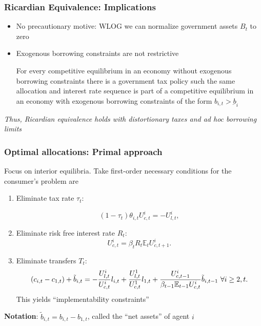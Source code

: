 \documentclass{beamer}
\begin{document}
\begin{frame}
 \frametitle{Ricardian Equivalence: Implications}
 \begin{itemize}
 \item No precautionary motive: WLOG  we can normalize government assets $B_t$ to zero
  \item Exogenous borrowing constraints are not restrictive
\begin{theorem}
 For every  competitive
equilibrium   in an economy without
exogenous borrowing constraints there is a government tax policy such the same allocation and interest rate sequence is  part of a competitive equilibrium
in an economy with exogenous borrowing constraints of the form $b_{i,t}>\underbar{b}_i$
\end{theorem}
  \end{itemize}

  \color{red}\emph{Thus, Ricardian equivalence holds with distortionary taxes and ad hoc borrowing limits}

\end{frame}


\begin{frame}
 \frametitle{Optimal allocations: Primal approach}
Focus on  interior equilibria. Take first-order necessary conditions for the  consumer's problem
 are%

 \begin{enumerate}
  \item Eliminate tax rate $\tau_t$:

\begin{equation*}
\left( 1-\tau _{t}\right) \theta _{i,t}U_{c,t}^{i}=-U_{l,t}^{i},
\end{equation*}%
\item Eliminate risk free interest rate $R_t$:
\begin{equation*}
U_{c,t}^{i}=\beta_tR_{t}\mathbb{E}_{t}U_{c,t+1}^{i}.  \label{FOC Euler}
\end{equation*}%
\item Eliminate transfers $T_t$:
{\small
\begin{equation*}
\left( c_{i,t}-c_{1,t}\right) +\tilde{b}_{i,t} =-\frac{U_{l,t}^{i}}{U_{c,t}^{i}}l_{i,t}+\frac{U^1_{l,t}}{U^1_{c,t}}l_{1,t} +\frac{U_{c,t-1}^{i}}{\beta_{t-1} \mathbb{E}%
_{t-1}U_{c,t}^{i}}\tilde{b}_{i,t-1}\ \forall i\geq2,t.  \notag
\end{equation*} }
This yields ``implementability constraints''%
 \end{enumerate}
\textbf{Notation}: $\tilde{b}_{i,t}=b_{i,t}-b_{1,t}$, called  the ``net assets'' of agent $i$
\end{frame}
\end{document}
